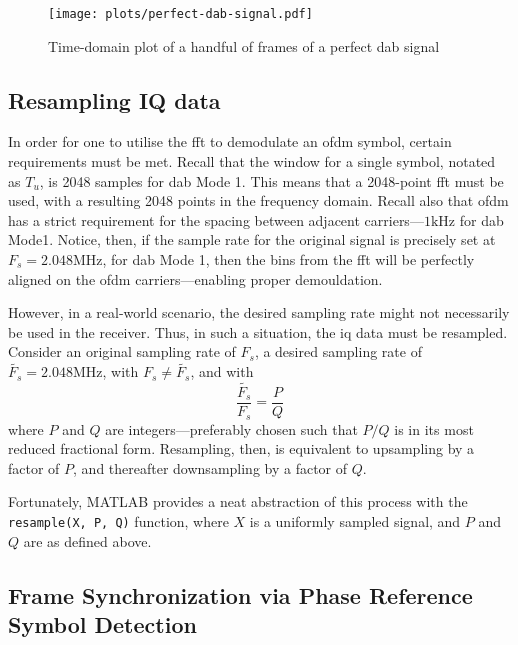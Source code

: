 \documentclass[class=report,11pt,crop=false]{standalone}
\begin{document}
\begin{figure}[htbp]
  \centering
  \captionsetup{type=figure}
  \texttt{[image: plots/perfect-dab-signal.pdf]}
  \caption{Time-domain plot of a handful of frames of a perfect \gls{dab} signal}
  \label{fig:plots/perfect-dab-signal}
\end{figure}

\subsection{Resampling IQ data \label{subsect:dab-proc_iq-resample}}
In order for one to utilise the \gls{fft} to demodulate an \gls{ofdm} symbol, certain requirements must be met. Recall that the window for a single symbol, notated as \(T_u\), is 2048 samples for \gls{dab} Mode 1. This means that a 2048-point \gls{fft} must be used, with a resulting 2048 points in the frequency domain. Recall also that \gls{ofdm} has a strict requirement for the spacing between adjacent carriers---\(1 \si{\kilo \hertz}\) for \gls{dab} Mode1. Notice, then, if the sample rate for the original signal is precisely set at \(F_s = 2.048 \si{\mega \hertz}\), for \gls{dab} Mode 1, then the bins from the \gls{fft} will be perfectly aligned on the \gls{ofdm} carriers---enabling proper demouldation.

However, in a real-world scenario, the desired sampling rate might not necessarily be used in the receiver. Thus, in such a situation, the \gls{iq} data must be resampled. Consider an original sampling rate of \(F_s\), a desired sampling rate of \(\tilde{F_s} = 2.048 \si{\mega \hertz}\), with \(F_s \ne \tilde{F_s}\), and with
\begin{equation}
  \frac{\tilde{F_s}}{F_s} = \frac{P}{Q}
\end{equation}
where \(P\) and \(Q\) are integers---preferably chosen such that \(P/Q\) is in its most reduced fractional form. Resampling, then, is equivalent to upsampling by a factor of \(P\), and thereafter downsampling by a factor of \(Q\).

Fortunately, MATLAB provides a neat abstraction of this process with the \texttt{resample(X, P, Q)} function, where \(X\) is a uniformly sampled signal, and \(P\) and \(Q\) are as defined above.

\subsection{Frame Synchronization via Phase Reference Symbol Detection \label{subsect:dab-proc_prs-detect}}
\end{document}
